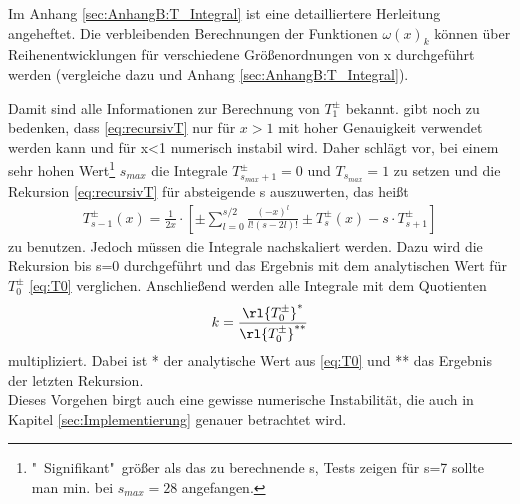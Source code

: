 %
Im Anhang \ref{sec:AnhangB:T_Integral} ist eine detailliertere Herleitung 
angeheftet. Die verbleibenden Berechnungen der Funktionen $\omega(x)_k$ können 
über
%
%
Reihenentwicklungen für verschiedene Größenordnungen von x  
%   
durchgeführt werden (vergleiche dazu \cite{av:1a2} und Anhang
\ref{sec:AnhangB:T_Integral}). 
%
%

Damit sind alle Informationen zur 
Berechnung von $T_1^\pm$ bekannt. \cite{av:1a} gibt noch zu bedenken, dass 
\ref{eq:recursivT} nur für $x>1$ mit hoher Genauigkeit verwendet werden kann 
und für x<1 numerisch instabil wird. Daher schlägt \cite{av:1a} vor, bei einem 
sehr hohen Wert\footnote{"\ Signifikant"\ größer als das zu berechnende s, 
Tests 
zeigen für s=7 sollte man min. bei $s_{max}=28$ angefangen.} $s_{max}$ 
die Integrale $T_{s_{max}+1}^\pm=0$ und $T_{s_{max}}=1$ zu 
setzen und die 
Rekursion \ref{eq:recursivT} für absteigende s auszuwerten, 
das heißt
%
\begin{align}\label{recursiveT2}
T^\pm_{s-1}(x)=\frac{1}{2x}\cdot 
\left[\pm\sum_{l=0}^{s/2}\frac{(-x)^l}{l!(s-2l)!}\pm T^\pm_s(x)-s\cdot 
T^\pm_{s+1}\right]
\end{align}
%
zu benutzen. Jedoch müssen die Integrale nachskaliert werden. 
Dazu wird die 
Rekursion bis s=0 durchgeführt und das Ergebnis mit dem analytischen Wert für 
$T_0^\pm$ \ref{eq:T0} verglichen. Anschließend werden alle Integrale mit dem 
Quotienten
%
\begin{align*}
k=\frac{\rl{T_0^{\pm}}^*}{\rl{T_0^\pm}^{**}}
\end{align*}
%
multipliziert. Dabei ist  * der analytische Wert aus \ref{eq:T0} und ** das 
Ergebnis 
der letzten Rekursion.\\
Dieses Vorgehen birgt auch eine gewisse numerische Instabilität, die auch in 
Kapitel \ref{sec:Implementierung} genauer betrachtet 
wird.%
%
%
%
